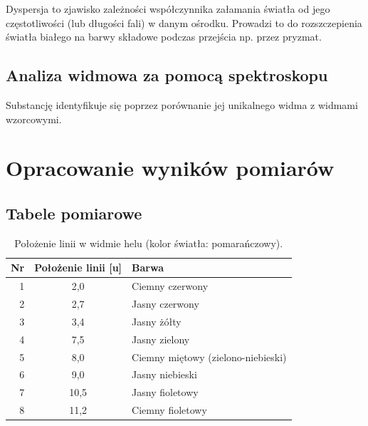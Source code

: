 \documentclass[a4paper,12pt]{article}
\begin{document}
Dyspersja to zjawisko zależności współczynnika załamania światła od jego częstotliwości (lub długości fali) w danym ośrodku. Prowadzi to do rozszczepienia światła białego na barwy składowe podczas przejścia np. przez pryzmat.~\cite{Drynski1976}


\subsection*{Analiza widmowa za pomocą spektroskopu}

Substancję identyfikuje się poprzez porównanie jej unikalnego widma z widmami wzorcowymi.


\section{Opracowanie wyników pomiarów}

\subsection{Tabele pomiarowe}

\begin{table}[H]
    \centering
    \begin{tabular}{|r|c|l|}
        \hline
        Nr & Położenie linii [u] & Barwa \\ \hline
        1 & 2{,}0 & Ciemny czerwony \\ \hline
        2 & 2{,}7 & Jasny czerwony \\ \hline
        3 & 3{,}4 & Jasny żółty \\ \hline
        4 & 7{,}5 & Jasny zielony \\ \hline
        5 & 8{,}0 & Ciemny miętowy (zielono-niebieski) \\ \hline
        6 & 9{,}0 & Jasny niebieski \\ \hline
        7 & 10{,}5 & Jasny fioletowy \\ \hline
        8 & 11{,}2 & Ciemny fioletowy \\ \hline
    \end{tabular}
    \caption{Położenie linii w widmie helu (kolor światła: pomarańczowy).}
    \label{tab:hel}
\end{table}
\end{document}
